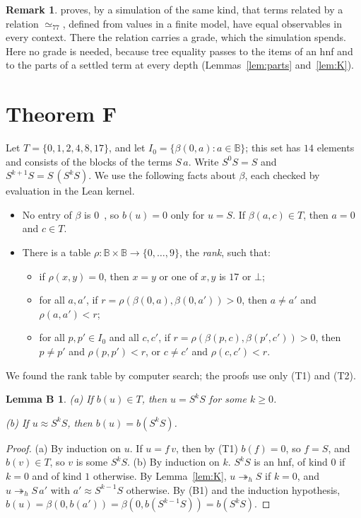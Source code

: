 \documentclass[11pt]{amsart}
\newtheorem*{lemB}{Lemma B}
\theoremstyle{definition}
\newtheorem{remark}[theorem]{Remark}
\newcommand{\hred}{\twoheadrightarrow_h}
\newcommand{\B}{\mathbb B}
\begin{document}
\begin{remark}
\citep[Theorem~9]{s6} proves, by a simulation of the same kind, that terms related by a relation
$\simeq_{77}$, defined from values in a finite model, have equal observables in every context. There
the relation carries a grade, which the simulation spends. Here no grade is needed, because tree equality passes to the items
of an hnf and to the parts of a settled term at every depth (Lemmas~\ref{lem:parts}
and~\ref{lem:K}).
\end{remark}

\section{Theorem F}\label{sec:F}

Let $T=\{0,1,2,4,8,17\}$, and let $I_0=\{\beta(0,a):a\in\B\}$; this set has $14$ elements and
consists of the blocks of the terms $S\,a$. Write $S^0S=S$ and $S^{k+1}S=S\,(S^kS)$. We use the following facts about $\beta$, each
checked by evaluation in the Lean kernel.
\begin{itemize}
\item[(T1)] No entry of $\beta$ is $0$~\citep[Lemma~8(i)]{s1}, so $b(u)=0$ only for $u=S$. If
  $\beta(a,c)\in T$, then $a=0$ and $c\in T$.
\item[(T2)] There is a table $\rho\colon\B\times\B\to\{0,\dots,9\}$, the \emph{rank}, such that:
  \begin{itemize}
  \item[(i)] if $\rho(x,y)=0$, then $x=y$ or one of $x,y$ is $17$ or $\bot$;
  \item[(ii)] for all $a,a'$, if $r=\rho(\beta(0,a),\beta(0,a'))>0$, then $a\ne a'$ and $\rho(a,a')<r$;
  \item[(iii)] for all $p,p'\in I_0$ and all $c,c'$, if $r=\rho(\beta(p,c),\beta(p',c'))>0$, then
    $p\ne p'$ and $\rho(p,p')<r$, or $c\ne c'$ and $\rho(c,c')<r$.
  \end{itemize}
\end{itemize}
We found the rank table by computer search; the proofs use only (T1) and (T2).

\begin{lemB}
\textup{(a)} If $b(u)\in T$, then $u=S^kS$ for some $k\ge0$.

\textup{(b)} If $u\approx S^kS$, then $b(u)=b(S^kS)$.
\end{lemB}

\begin{proof}
(a) By induction on $u$. If $u=f\,v$, then by (T1) $b(f)=0$, so $f=S$, and $b(v)\in T$, so $v$ is
some $S^kS$. (b) By induction on $k$. $S^kS$ is an hnf, of kind $0$ if $k=0$ and of kind $1$
otherwise. By Lemma~\ref{lem:K}, $u\hred S$ if $k=0$, and $u\hred S\,a'$ with $a'\approx S^{k-1}S$
otherwise. By (B1) and the induction hypothesis, $b(u)=\beta(0,b(a'))=\beta(0,b(S^{k-1}S))=b(S^kS)$.
\end{proof}
\end{document}
